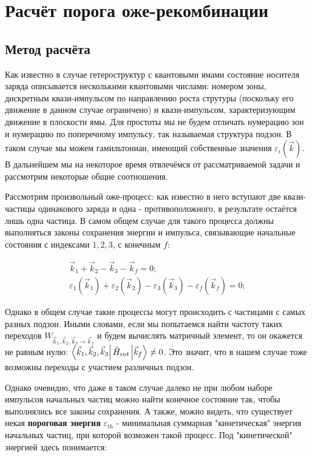 \documentclass[../main.tex]{subfiles}
\begin{document}
    \chapter{Расчёт порога оже-рекомбинации}
    \section{Метод расчёта}

    Как известно в случае гетероструктур с квантовыми ямами состояние
    носителя заряда описывается несколькими квантовыми числами: номером зоны,
    дискретным квази-импульсом по направлению роста струтуры (поскольку его движение
    в данном случае ограничено) и квази-импульсом, характеризующим движение
    в плоскости ямы. Для простоты мы не будем отличать нумерацию зон и нумерацию
    по поперечному импульсу, так называемая структура подзон. В таком случае мы 
    можем гамильтониан, имеющий собственные значения $\varepsilon_i (\vec{k})$. 
    В дальнейшем мы на некоторое время отвлечёмся от рассматриваемой задачи и 
    рассмотрим некоторые общие соотношения.

    Рассмотрим произвольный оже-процесс: как известно в него вступают две квази-частицы
    одинакового заряда и одна - противоположного, в результате остаётся лишь одна частица.
    В самом общем случае для такого процесса должны выполняться законы сохранения энергии и 
    импульса, связывающие начальные состояния с индексами $1,2,3$, с конечным $f$:

    \begin{equation}
        \begin{array}{l}
            \vec{k}_1 + \vec{k}_2 - \vec{k}_3 - \vec{k}_f = 0;\\
            \varepsilon_1(\vec{k}_1) + \varepsilon_2(\vec{k}_2) - \varepsilon_3(\vec{k}_3) - \varepsilon_f(\vec{k}_f) = 0;
        \end{array}
    \end{equation}

    Однако в общем случае такие процессы могут происходить с частицами с самых 
    разных подзон. Иными словами, если мы попытаемся найти частоту таких переходов
    $W_{\vec{k}_1, \vec{k}_2, \vec{k}_3 \rightarrow \vec{k}_f}$ и будем вычислять
    матричный элемент, то он окажется не равным нулю:
    $\bra{\vec{k}_1, \vec{k}_2, \vec{k}_3} \hat{H}_{int} \ket{\vec{k}_f} \neq 0$.
    Это значит, что в нашем случае тоже возможны переходы с участием различных 
    подзон.

    Однако очевидно, что даже в таком случае далеко не при любом наборе импульсов
    начальных частиц можно найти конечное состояние так, чтобы выполнялись все 
    законы сохранения. А также, можно видеть, что существует некая 
    \textbf{пороговая энергия} $\varepsilon_{th}$ - минимальная суммарная 
    "кинетическая" энергия начальных частиц, при которой возможен такой процесс.
    Под "кинетической" энергией здесь понимается:
\end{document}
